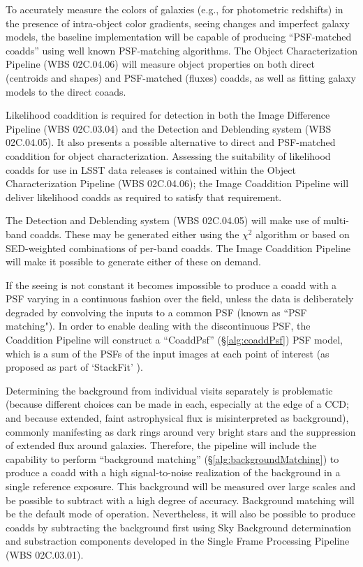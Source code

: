 \documentclass[12pt]{article}
\newcommand{\wbsSFM}{WBS 02C.03.01}
\newcommand{\wbsDiffim}{WBS 02C.03.04}
\newcommand{\wbsDetDeblend}{WBS 02C.04.05}
\newcommand{\wbsObjChar}{WBS 02C.04.06}
\begin{document}
To accurately measure the colors of galaxies (e.g., for photometric redshifts) in the presence of intra-object color gradients, seeing changes and imperfect galaxy models, the baseline implementation will be capable of producing ``PSF-matched coadds'' using well known PSF-matching algorithms. The Object Characterization Pipeline (\wbsObjChar) will measure object properties on both direct (centroids and shapes) and PSF-matched (fluxes) coadds, as well as fitting galaxy models to the direct coaads.

Likelihood coaddition is required for detection in both the Image Difference Pipeline (\wbsDiffim{}) and the Detection and Deblending system (\wbsDetDeblend{}). It also presents a possible alternative to direct and PSF-matched coaddition for object characterization. Assessing the suitability of likelihood coadds for use in LSST data releases is contained within the Object Characterization Pipeline (\wbsObjChar); the Image Coaddition Pipeline will deliver likelihood coadds as required to satisfy that requirement.

The Detection and Deblending system (\wbsDetDeblend) will make use of multi-band coadds. These may be generated either using the $\chi^2$ algorithm \cite{Szalay99} or based on SED-weighted combinations of per-band coadds. The Image Coaddition Pipeline will make it possible to generate either of these on demand.

If the seeing is not constant it becomes impossible to produce a coadd with a PSF varying in a continuous fashion over the field, unless the data is deliberately degraded by convolving the inputs to a common PSF (known as ``PSF matching").  In order to enable dealing with the discontinuous PSF, the Coaddition Pipeline will construct a ``CoaddPsf'' (\S\ref{alg:coaddPsf}) PSF model, which is a sum of the PSFs of the input images at each point of interest (as proposed as part of `StackFit' \cite{Jee13}).

Determining the background from individual visits separately is problematic (because different choices can be made in each, especially at the edge of a CCD; and because extended, faint astrophysical flux is misinterpreted as background), commonly manifesting as dark rings around very bright stars and the suppression of extended flux around galaxies. Therefore, the pipeline will include the capability to perform ``background matching'' (\S\ref{alg:backgroundMatching}) to produce a coadd with a high signal-to-noise realization of the background in a single reference exposure.  This background will be measured over large scales and be possible to subtract with a high degree of accuracy. Background matching will be the default mode of operation. Nevertheless, it will also be possible to produce coadds by subtracting the background first using Sky Background determination and substraction components developed in the Single Frame Processing Pipeline (\wbsSFM).
\end{document}
